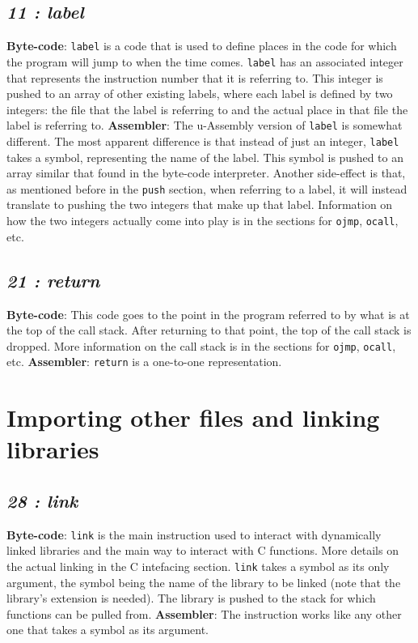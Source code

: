 \documentclass[12pt]{report}
\begin{document}
  \subsection{\emph{11 : label}}
  \textbf{Byte-code}: \verb|label| is a code that is used to define places in the code
  for which the program will jump to when the time comes.  \verb|label| has an
  associated integer that represents the instruction number that it is referring to.
  This integer is pushed to an array of other existing labels, where each label is
  defined by two integers: the file that the label is referring to and the actual
  place in that file the label is referring to.\newline
  \textbf{Assembler}: The u-Assembly version of \verb|label| is somewhat different.
  The most apparent difference is that instead of just an integer, \verb|label| takes
  a symbol, representing the name of the label.  This symbol is pushed to an array
  similar that found in the byte-code interpreter.  Another side-effect is that,
  as mentioned before in the \verb|push| section, when referring to a label, it
  will instead translate to pushing the two integers that make up that label.
  \newline
  Information on how the two integers actually come into play is in the sections for
  \verb|ojmp|, \verb|ocall|, etc.
  \subsection{\emph{21 : return}}
  \textbf{Byte-code}: This code goes to the point in the program referred to by what
  is at the top of the call stack.  After returning to that point, the top of
  the call stack is dropped.  More information on the call stack is in the sections for
  \verb|ojmp|, \verb|ocall|, etc.
  \textbf{Assembler}: \verb|return| is a one-to-one representation.

  \section{Importing other files and linking libraries}
  \subsection{\emph{28 : link}}
  \textbf{Byte-code}: \verb|link| is the main instruction used to interact with
  dynamically linked libraries and the main way to interact with C functions.  More
  details on the actual linking in the C intefacing section.  \verb|link| takes a
  symbol as its only argument, the symbol being the name of the library to be linked
  (note that the library's extension is needed).  The library is pushed to the stack
  for which functions can be pulled from.
  \textbf{Assembler}: The instruction works like any other one that takes a symbol as
  its argument.
\end{document}
